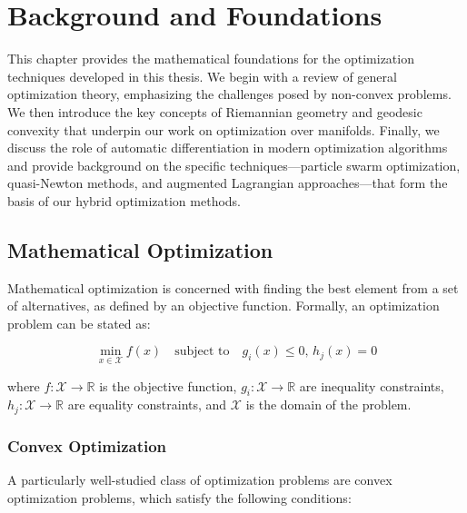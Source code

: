 \chapter{Background and Foundations}

This chapter provides the mathematical foundations for the optimization techniques developed in this thesis. We begin with a review of general optimization theory, emphasizing the challenges posed by non-convex problems. We then introduce the key concepts of Riemannian geometry and geodesic convexity that underpin our work on optimization over manifolds. Finally, we discuss the role of automatic differentiation in modern optimization algorithms and provide background on the specific techniques—particle swarm optimization, quasi-Newton methods, and augmented Lagrangian approaches—that form the basis of our hybrid optimization methods.

\section{Mathematical Optimization}

Mathematical optimization is concerned with finding the best element from a set of alternatives, as defined by an objective function. Formally, an optimization problem can be stated as:

\begin{equation}
\min_{x \in \mathcal{X}} f(x) \quad \text{subject to} \quad g_i(x) \leq 0, \, h_j(x) = 0
\end{equation}

where $f: \mathcal{X} \rightarrow \mathbb{R}$ is the objective function, $g_i: \mathcal{X} \rightarrow \mathbb{R}$ are inequality constraints, $h_j: \mathcal{X} \rightarrow \mathbb{R}$ are equality constraints, and $\mathcal{X}$ is the domain of the problem.

\subsection{Convex Optimization}

A particularly well-studied class of optimization problems are convex optimization problems, which satisfy the following conditions:

